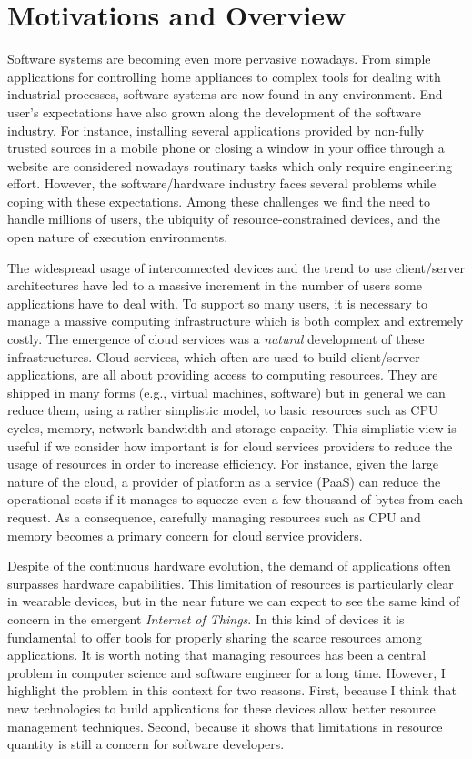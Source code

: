 \section{Motivations and Overview}

Software systems are becoming even more pervasive nowadays.
From simple applications for controlling home appliances to complex tools for dealing with industrial processes, software systems are now found in any environment.
End-user's expectations have also grown along the development of the software industry.
For instance, installing several applications provided by non-fully trusted sources in a mobile phone or closing a window in your office through a website are considered nowadays routinary  tasks which only require engineering effort.
However, the software/hardware industry faces several problems while coping with these expectations.
Among these challenges we find the need to handle millions of users, the ubiquity of resource-constrained devices, and the
open nature of execution environments.   

The widespread usage of interconnected devices and the trend to use client/server architectures have led to a massive increment in the number of users some applications have to deal with.
To support so many users, it is necessary to manage a massive computing infrastructure which is both complex and extremely costly.
The emergence of cloud services was a \textit{natural} development of these infrastructures.
Cloud services, which often are used to  build client/server applications,  are all about providing access to computing resources.
They are shipped in many forms (e.g., virtual machines, software) but in general we can reduce them, using a rather simplistic model, to basic resources such as CPU cycles, memory, network bandwidth and storage capacity.
This simplistic view is useful if we consider how important is for cloud services providers to reduce the usage of resources in order to increase efficiency.
For instance, given the large nature of the cloud, a provider of platform as a service (PaaS) can reduce the operational costs if it manages to squeeze even a few thousand of bytes from each request.
As a consequence, carefully managing resources such as CPU and memory becomes a primary concern for cloud service providers.

Despite of the continuous hardware evolution, the demand of applications often surpasses hardware capabilities.
This limitation of resources is particularly clear in wearable devices, but in the near future we can expect to see the same kind of concern in the emergent \textit{Internet of Things}.
In this kind of devices it is fundamental to offer tools for properly sharing the scarce resources among applications.
It is worth noting that managing resources has been a central problem in computer science and software engineer for a long time.
However, I highlight the problem in this context for two reasons.
First, because I think that new technologies to build applications for these devices allow better resource management techniques.
Second, because it shows that limitations in resource quantity is still a concern for software developers.

